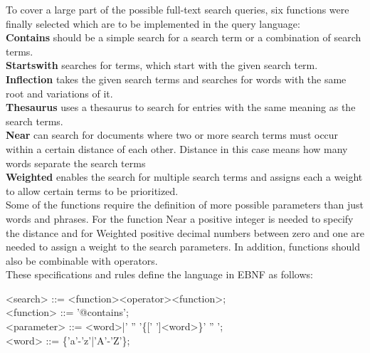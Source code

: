To cover a large part of the possible full-text search queries, six functions were finally selected which are to be implemented in the query language:\\
\textbf{Contains} should be a simple search for a search term or a combination of search terms.\\
\textbf{Startswith} searches for terms, which start with the given search term.\\
\textbf{Inflection} takes the given search terms and searches for words with the same root and variations of it.\\
\textbf{Thesaurus} uses a thesaurus to search for entries with the same meaning as the search terms.\\
\textbf{Near} can search for documents where two or more search terms must occur within a certain distance of each other. Distance in this case means how many words separate the search terms\\
\textbf{Weighted} enables the search for multiple search terms and assigns each a weight to allow certain terms to be prioritized.\\
Some of the functions require the definition of more possible parameters than just words and phrases. For the function Near a positive integer is needed to specify the distance and for Weighted positive decimal numbers between zero and one are needed to assign a weight to the search parameters. In addition, functions should also be combinable with operators.\\
These specifications and rules define the language in \ac{EBNF} as follows:
\begin{grammar}
    <search> ::= <function><operator><function>; \\
    <function> ::= '@contains'; \\
    <parameter> ::= <word>|' '' '\{[' ']<word>\}' '' '; \\
    <word> ::= \{'a'-'z'|'A'-'Z'\};
\end{grammar}